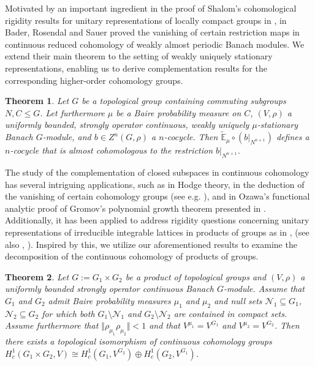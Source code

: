 \documentclass[a4paper,11pt,reqno]{amsart}
\numberwithin{equation}{section}
\newtheorem{letterthm}{Theorem}
\theoremstyle{definition}
\theoremstyle{remark}
\theoremstyle{remark}
\begin{document}
Motivated by an important ingredient in the proof of Shalom's cohomological rigidity results for unitary representations of locally compact groups in \cite{Shalom00}, in \cite{BaderRosendalSauer} Bader, Rosendal and Sauer proved the vanishing of certain restriction maps in continuous reduced cohomology of weakly almost periodic Banach modules. We extend their main theorem to the setting of weakly uniquely stationary representations, enabling us to derive complementation results for the corresponding higher-order cohomology groups.

\begin{letterthm} Let $G$ be a topological group containing commuting subgroups $N,C\leq G$. Let furthermore $\mu$ be a Baire probability measure on $C$, $(V,\rho)$ a uniformly bounded, strongly operator continuous, weakly uniquely $\mu$-stationary Banach $G$-module, and $b\in Z^{n}(G,\rho)$ a $n$-cocycle. Then $\widetilde{\mathbb{E}}_{\mu}\circ(b|_{N^{n+1}})$ defines a $n$-cocycle that is almost cohomologous to the restriction $b|_{N^{n+1}}$. \end{letterthm}

The study of the complementation of closed subspaces in continuous cohomology has several intriguing applications, such as in Hodge theory, in the deduction of the vanishing of certain cohomology groups (see e.g. \cite{Garland73}), and in Ozawa's functional analytic proof of Gromov's polynomial growth theorem presented in \cite{Ozawa18}. Additionally, it has been applied to address rigidity questions concerning unitary representations of irreducible integrable lattices in products of groups as in \cite{Shalom00}, \cite{BaderFurmanGelanderMonod} (see also \cite{Creutz11}, \cite{Creutz22}). Inspired by this, we utilize our aforementioned results to examine the decomposition of the continuous cohomology of products of groups. 

\begin{letterthm} Let $G:=G_{1}\times G_{2}$ be a product of topological groups and $(V,\rho)$ a uniformly bounded strongly operator continuous Banach $G$-module. Assume that $G_{1}$ and $G_{2}$ admit Baire probability measures $\mu_{1}$ and $\mu_{2}$ and null sets $\mathcal{N}_{1}\subseteq G_{1}$, $\mathcal{N}_{2}\subseteq G_{2}$ for which both $G_{1}\setminus\mathcal{N}_{1}$ and $G_{2}\setminus\mathcal{N}_{2}$ are contained in compact sets. Assume furthermore that $\Vert\rho_{\mu_{1}}\rho_{\mu_{2}}\Vert<1$ and that $V^{\mu_{1}}=V^{G_{1}}$ and $V^{\mu_{2}}=V^{G_{2}}$. Then there exists a topological isomorphism of continuous cohomology groups $H_{c}^{1}(G_{1}\times G_{2},V)\cong H_{c}^{1}(G_{1},V^{G_{2}})\oplus H_{c}^{1}(G_{2},V^{G_{1}})$. \end{letterthm}
\end{document}
